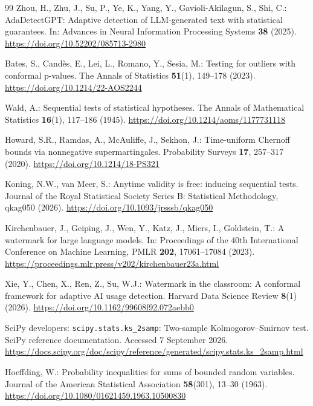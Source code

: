 \documentclass[pdflatex,sn-mathphys-num]{sn-jnl}
\begin{document}
\begin{thebibliography}{99}
Zhou, H., Zhu, J., Su, P., Ye, K., Yang, Y., Gavioli-Akilagun, S., Shi, C.:
AdaDetectGPT: Adaptive detection of LLM-generated text with statistical guarantees.
In: Advances in Neural Information Processing Systems \textbf{38} (2025).
\url{https://doi.org/10.52202/085713-2980}

Bates, S., Cand\`es, E., Lei, L., Romano, Y., Sesia, M.:
Testing for outliers with conformal p-values.
The Annals of Statistics \textbf{51}(1), 149--178 (2023).
\url{https://doi.org/10.1214/22-AOS2244}

Wald, A.:
Sequential tests of statistical hypotheses.
The Annals of Mathematical Statistics \textbf{16}(1), 117--186 (1945).
\url{https://doi.org/10.1214/aoms/1177731118}

Howard, S.R., Ramdas, A., McAuliffe, J., Sekhon, J.:
Time-uniform Chernoff bounds via nonnegative supermartingales.
Probability Surveys \textbf{17}, 257--317 (2020).
\url{https://doi.org/10.1214/18-PS321}

Koning, N.W., van Meer, S.:
Anytime validity is free: inducing sequential tests.
Journal of the Royal Statistical Society Series B: Statistical Methodology, qkag050 (2026).
\url{https://doi.org/10.1093/jrsssb/qkag050}

Kirchenbauer, J., Geiping, J., Wen, Y., Katz, J., Miers, I., Goldstein, T.:
A watermark for large language models.
In: Proceedings of the 40th International Conference on Machine Learning, PMLR \textbf{202}, 17061--17084 (2023).
\url{https://proceedings.mlr.press/v202/kirchenbauer23a.html}

Xie, Y., Chen, X., Ren, Z., Su, W.J.:
Watermark in the classroom: A conformal framework for adaptive AI usage detection.
Harvard Data Science Review \textbf{8}(1) (2026).
\url{https://doi.org/10.1162/99608f92.072aebb0}

SciPy developers:
\texttt{scipy.stats.ks\_2samp}: Two-sample Kolmogorov--Smirnov test.
SciPy reference documentation. Accessed 7 September 2026.
\url{https://docs.scipy.org/doc/scipy/reference/generated/scipy.stats.ks_2samp.html}

Hoeffding, W.:
Probability inequalities for sums of bounded random variables.
Journal of the American Statistical Association \textbf{58}(301), 13--30 (1963).
\url{https://doi.org/10.1080/01621459.1963.10500830}


\end{thebibliography}
\end{document}
